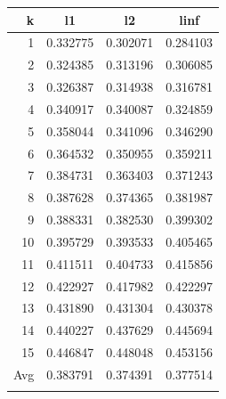 \documentclass{article} %
\begin{document}
\begin{table}[!ht]
\begin{minipage}{0.33333\textwidth}
{\begin{tabular}[t]{||r | c c c||}
      k  &       l1 & \cellcolor{cyan}l2 &      linf \\
      \hline
      \cellcolor{yellow}1   & 0.332775  & \cellcolor{yellow}0.302071  & 0.284103 \\
      2   & 0.324385  & 0.313196  & 0.306085 \\
      3   & 0.326387  & 0.314938  & 0.316781 \\
      4   & 0.340917  & 0.340087  & 0.324859 \\
      5   & 0.358044  & 0.341096  & 0.346290 \\
      6   & 0.364532  & 0.350955  & 0.359211 \\
      7   & 0.384731  & 0.363403  & 0.371243 \\
      8   & 0.387628  & 0.374365  & 0.381987 \\
      9   & 0.388331  & 0.382530  & 0.399302 \\
      10  & 0.395729  & 0.393533  & 0.405465 \\
      11  & 0.411511  & 0.404733  & 0.415856 \\
      12  & 0.422927  & 0.417982  & 0.422297 \\
      13  & 0.431890  & 0.431304  & 0.430378 \\
      14  & 0.440227  & 0.437629  & 0.445694 \\
      15  & 0.446847  & 0.448048  & 0.453156 \\
      \hline
      Avg&  0.383791 & \cellcolor{cyan}0.374391 &  0.377514 \\
      \hline
      \rowcolor{pink}\multicolumn{4}{||c||}{Test Set RMSE: 0.237871}\\
      \hline    \end{tabular}}
  \end{minipage}
  \begin{minipage}{0.33333\textwidth}
  \centering
\end{minipage}
\end{table}
\end{document}
